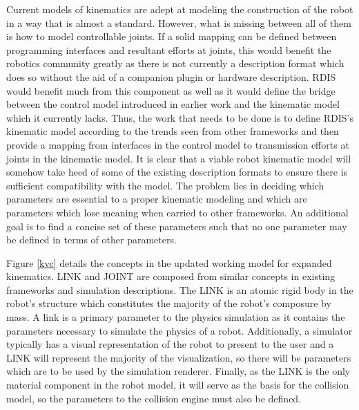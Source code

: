 Current models of kinematics are adept at modeling the construction of the robot in a way that is almost a standard. However, what is missing between all of them is how to model controllable joints. If a solid mapping can be defined between programming interfaces and resultant efforts at joints, this would benefit the robotics community greatly as there is not currently a description format which does so without the aid of a companion plugin or hardware description. RDIS would benefit much from this component as well as it would define the bridge between the control model introduced in earlier work \cite{Anderson2012} and the kinematic model which it currently lacks. Thus, the work that needs to be done is to define RDIS's kinematic model according to the trends seen from other frameworks and then provide a mapping from interfaces in the control model to transmission efforts at joints in the kinematic model. It is clear that a viable robot kinematic model will somehow take heed of some of the existing description formats to ensure there is sufficient compatibility with the model. The problem lies in deciding which parameters are essential to a proper kinematic modeling and which are parameters which lose meaning when carried to other frameworks. An additional goal is to find a concise set of these parameters such that no one parameter may be defined in terms of other parameters. 

Figure \ref{kvc} details the concepts in the updated working model for expanded kinematics.  LINK and JOINT are composed from similar concepts in existing frameworks and simulation descriptions.  The LINK is an atomic rigid body in the robot's structure which constitutes the majority of the robot's composure by mass. A link is a primary parameter to the physics simulation as it contains the parameters necessary to simulate the physics of a robot. Additionally, a simulator typically has a visual representation of the robot to present to the user and a LINK will represent the majority of the visualization, so there will be parameters which are to be used by the simulation renderer. Finally, as the LINK is the only material component in the robot model, it will serve as the basis for the collision model, so the parameters to the collision engine must also be defined.

